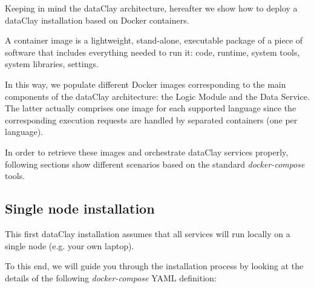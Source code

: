Keeping in mind the dataClay architecture, hereafter we show how to deploy a dataClay installation based on Docker containers.

A container image is a lightweight, stand-alone, executable package of a piece of software that includes everything needed to run it: code, runtime, system tools, system libraries, settings. 

In this way, we populate different Docker images corresponding to the main components of the dataClay architecture: the Logic Module and the Data Service. The latter actually comprises one image for each supported language since the corresponding execution requests are handled by separated containers (one per language). 

In order to retrieve these images and orchestrate dataClay services properly, following sections show different scenarios based on the standard \textit{docker-compose} tools.

\subsection{Single node installation}
\label{sec:SingleNodeInstall}
This first dataClay installation assumes that all services will run locally on a single node (e.g. your own laptop).

To this end, we will guide you through the installation process by looking at the details of the following \textit{docker-compose} YAML definition:

